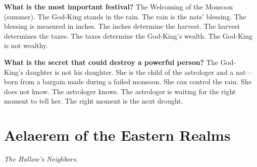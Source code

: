 \begin{almanac}
\textbf{What is the most important festival?} The Welcoming of the Monsoon (summer). The God-King stands in the rain. The rain is the nats' blessing. The blessing is measured in inches. The inches determine the harvest. The harvest determines the taxes. The taxes determine the God-King's wealth. The God-King is not wealthy.

\textbf{What is the secret that could destroy a powerful person?} The God-King's daughter is not his daughter. She is the child of the astrologer and a nat---born from a bargain made during a failed monsoon. She can control the rain. She does not know. The astrologer knows. The astrologer is waiting for the right moment to tell her. The right moment is the next drought.
\end{almanac}

\newpage

\newpage

\chapter{Aelaerem of the Eastern Realms}
\label{chap:aelaerem-east}

\emph{The Hollow's Neighbors.}

